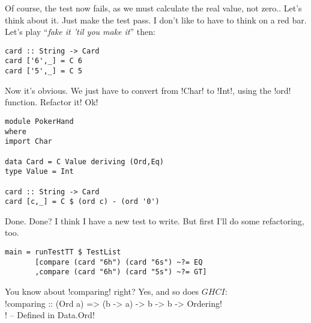 \failure Of course, the test now fails, as we must calculate the real value, not zero.. Let's think about it.
\lhN \failure Just make the test pass. I don't like to have to think on a red bar.
\lhA \failure Let's play ``\emph{fake it 'til you make it}'' then:
\begin{lstlisting}[frame=single]
card :: String -> Card
card ['6',_] = C 6
card ['5',_] = C 5 
\end{lstlisting}
\success Now it's obvious.
\lhN \success We just have to convert from \il!Char! to \il!Int!, using the \il!ord! function. Refactor it!
\lhA \success Ok!
\begin{lstlisting}[frame=single]
module PokerHand
where
import Char

data Card = C Value deriving (Ord,Eq)
type Value = Int

card :: String -> Card
card [c,_] = C $ (ord c) - (ord '0')
\end{lstlisting} %
\success Done.
\lhN Done? I think I have a new test to write. But first I'll do some refactoring, too.
\begin{lstlisting}[frame=single]
main = runTestTT $ TestList 
       [compare (card "6h") (card "6s") ~?= EQ
       ,compare (card "6h") (card "5s") ~?= GT]
\end{lstlisting} %
You know about \il!comparing! right?
\lhA Yes, and so does $GHCI$: \\

\il!comparing :: (Ord a) => (b -> a) -> b -> b -> Ordering! \\
\il! -- Defined in Data.Ord! \\


